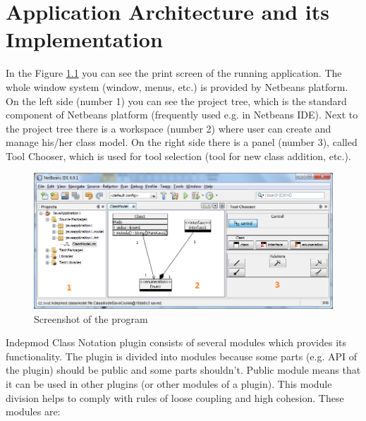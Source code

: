 \chapter{Application Architecture and its Implementation}

In the Figure \ref{f-screenSmallModule} you can see the print screen of the running application. The whole window system (window, menus, etc.) is provided by Netbeans platform. On the left side (number 1) you can see the project tree, which is the standard component of Netbeans platform (frequently used e.g. in Netbeans IDE). Next to the project tree there is a workspace (number 2) where user can create and manage his/her class model. On the right side there is a panel (number 3), called Tool Chooser, which is used for tool selection (tool for new class addition, etc.).

\begin{figure}[!ht]
\begin{center}
\includegraphics[width=\textwidth]{img/screenSmall.png}
\caption{Screenshot of the program}
\label{f-screenSmallModule}
\end{center}
\end{figure}

Indepmod Class Notation plugin consists of several modules which provides its functionality. The plugin is divided into modules because some parts (e.g. API of the plugin) should be public and some parts shouldn't. Public module means that it can be used in other plugins (or other modules of a plugin). This module division helps to comply with rules of loose coupling and high cohesion. These modules are:

